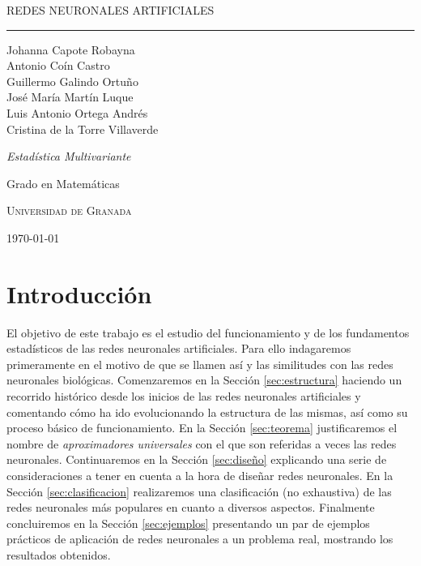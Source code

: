 \documentclass[
  a4paper,
  12pt,
  spanish,
]{scrartcl}
\DeclareRobustCommand{\spacedallcaps}[1]{{\linespread{1.3}\sacshape\MakeTextUppercase{#1}}}%
\theoremstyle{teorema-style}
\newcommand{\horrule}[1]{\rule{\linewidth}{#1}}
\begin{document}
\begin{titlepage}
  \vspace*{4cm}

  \begin{flushleft}
    \Huge
    \spacedallcaps{Redes neuronales artificiales}
    \horrule{2pt}
  \end{flushleft}

  \vspace{2em}

  \begin{flushright}
    \large
    Johanna Capote Robayna\\
    Antonio Coín Castro\\
    Guillermo Galindo Ortuño\\
    José María Martín Luque\\
    Luis Antonio Ortega Andrés\\
    Cristina de la Torre Villaverde
    \vspace{1em}

    \textit{Estadística Multivariante}

    Grado en Matemáticas

    \textsc{Universidad de Granada}\vspace{1em}

    \today\vspace{.5em}
  \end{flushright}
\end{titlepage}

\newpage

{\hypersetup{hidelinks}
\tableofcontents
}

\newpage

\section{Introducción}

El objetivo de este trabajo es el estudio del funcionamiento y de los fundamentos estadísticos de las redes neuronales artificiales.
Para ello indagaremos primeramente en el motivo de que se llamen así y las similitudes con las redes neuronales biológicas. Comenzaremos en la Sección \ref{sec:estructura} haciendo un recorrido histórico desde los inicios de las redes neuronales artificiales y comentando cómo ha ido evolucionando la estructura de las mismas, así como su proceso básico de funcionamiento. En la Sección \ref{sec:teorema} justificaremos el nombre de \textit{aproximadores universales} con el que son referidas a veces las redes neuronales. Continuaremos en la Sección \ref{sec:diseño} explicando una serie de consideraciones a tener en cuenta a la hora de diseñar redes neuronales. En la Sección \ref{sec:clasificacion} realizaremos una clasificación (no exhaustiva) de las redes neuronales más populares en cuanto a diversos aspectos. Finalmente concluiremos en la Sección \ref{sec:ejemplos} presentando un par de ejemplos prácticos de aplicación de redes neuronales a un problema real, mostrando los resultados obtenidos.
\end{document}
